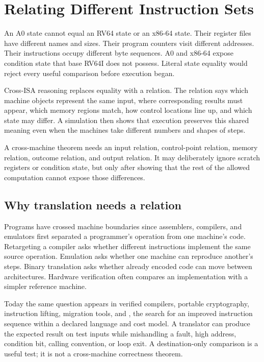 \chapter{Relating Different Instruction Sets}
\label{ch:cross-isa}

An A0 state cannot equal an RV64 state or an x86-64 state. Their register
files have different names and sizes. Their program counters visit different
addresses. Their instructions occupy different byte sequences. A0 and
x86-64 expose condition state that base RV64I does not possess. Literal state
equality would reject every useful comparison before execution began.

Cross-ISA reasoning replaces equality with a relation. The relation says which
machine objects represent the same input, where corresponding results must
appear, which memory regions match, how control locations line up, and which
state may differ. A simulation then shows that execution preserves this shared
meaning even when the machines take different numbers and shapes of steps.

\begin{keyidea}[title={Relate meaning, not register names}]
A cross-machine theorem needs an input relation, control-point relation,
memory relation, outcome relation, and output relation. It may deliberately
ignore scratch registers or condition state, but only after showing that the
rest of the allowed computation cannot expose those differences.
\end{keyidea}

\section{Why translation needs a relation}

Programs have crossed machine boundaries since assemblers, compilers, and
emulators first separated a programmer's operation from one machine's code.
Retargeting a compiler asks whether different instructions implement the same
source operation. Emulation asks whether one machine can reproduce another's
steps. Binary translation asks whether already encoded code can move between
architectures. Hardware verification often compares an implementation with a
simpler reference machine.

Today the same question appears in verified compilers, portable cryptography,
instruction lifting, migration tools, and , the
search for an improved instruction sequence within a declared language and
cost model. A translator can
produce the expected result on test inputs while mishandling a fault, high
address, condition bit, calling convention, or loop exit. A destination-only
comparison is a useful test; it is not a cross-machine correctness theorem.

